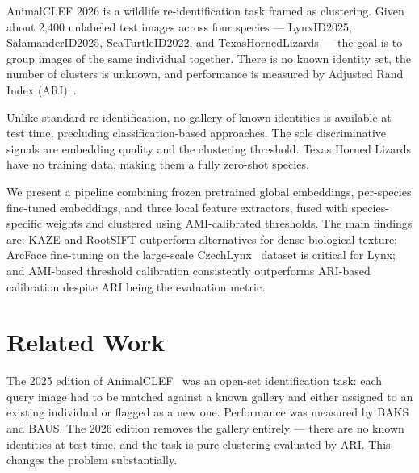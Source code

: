 \documentclass[]{ceurart}
\begin{document}
AnimalCLEF 2026 is a wildlife re-identification task framed as clustering. Given
about 2,400 unlabeled test images across four species --- LynxID2025,
SalamanderID2025, SeaTurtleID2022, and TexasHornedLizards --- the goal is to
group images of the same individual together. There is no known identity set,
the number of clusters is unknown, and performance is measured by Adjusted Rand
Index (ARI)~\cite{picek2025animalclef}.

Unlike standard re-identification, no gallery of known identities is available at
test time, precluding classification-based approaches. The sole discriminative
signals are embedding quality and the clustering threshold. Texas Horned Lizards
have no training data, making them a fully zero-shot species.

We present a pipeline combining frozen pretrained global embeddings,
per-species fine-tuned embeddings, and three local feature extractors, fused
with species-specific weights and clustered using AMI-calibrated thresholds.
The main findings are: KAZE and RootSIFT outperform alternatives for dense
biological texture; ArcFace fine-tuning on the large-scale
CzechLynx~\cite{picek2025czechlynx} dataset is critical for Lynx; and
AMI-based threshold calibration consistently outperforms ARI-based calibration
despite ARI being the evaluation metric.

\section{Related Work}

The 2025 edition of AnimalCLEF~\cite{adam2025animalclef} was an open-set
identification task: each query image had to be matched against a known gallery
and either assigned to an existing individual or flagged as a new one.
Performance was measured by BAKS and BAUS. The 2026 edition removes the gallery
entirely --- there are no known identities at test time, and the task is pure
clustering evaluated by ARI. This changes the problem substantially.
\end{document}
